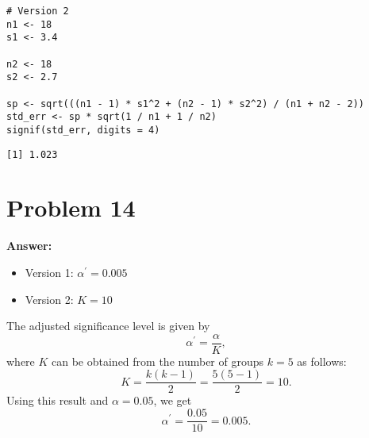 \documentclass[11pt]{article}
\begin{document}
\begin{verbatim}
# Version 2
n1 <- 18
s1 <- 3.4

n2 <- 18
s2 <- 2.7

sp <- sqrt(((n1 - 1) * s1^2 + (n2 - 1) * s2^2) / (n1 + n2 - 2))
std_err <- sp * sqrt(1 / n1 + 1 / n2)
signif(std_err, digits = 4)
\end{verbatim}

\label{}
\begin{verbatim}
[1] 1.023
\end{verbatim}
\section*{Problem 14}
\label{sec:org9e09806}

\textbf{Answer:}
\begin{itemize}
\item Version 1: \(\alpha^{\prime}=0.005\)
\item Version 2: \(K=10\)\\
\end{itemize}

The adjusted significance level is given by
\begin{equation}
\alpha^{\prime}=\frac{\alpha}{K},
\end{equation}
where \(K\) can be obtained from the number of groups \(k=5\) as follows:
\begin{equation}
K=\frac{k(k-1)}{2}=\frac{5(5-1)}{2}=10.
\end{equation}
Using this result and \(\alpha=0.05\), we get
\begin{equation}
\alpha^{\prime}=\frac{0.05}{10}=0.005.
\end{equation}
\end{document}
